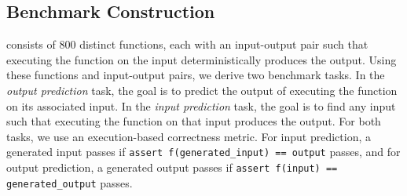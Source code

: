 


\subsection{Benchmark Construction} \label{sec:benchmark-construction}

\benchmark consists of 800 distinct functions, each with an input-output pair such that executing the function on the input deterministically produces the output. Using these functions and input-output pairs, we derive two benchmark tasks. In the \textit{output prediction} task, the goal is to predict the output of executing the function on its associated input. In the \textit{input prediction} task, the goal is to find any input such that executing the function on that input produces the output. For both tasks, we use an execution-based correctness metric. For input prediction, a generated input passes if \texttt{assert f(generated\_input) == output} passes, and for output prediction, a generated output passes if \texttt{assert f(input) == generated\_output} passes.

